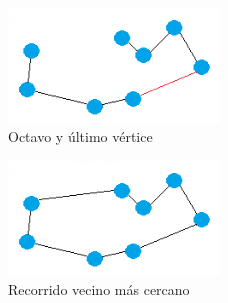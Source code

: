 \begin{frame}
	\begin{exampleblock}{ } 
	\begin{figure}[htbH] 
		\centering
		\includegraphics[width=0.5\textwidth]{./Imagenes/arista8.png}
		\caption{Octavo y último vértice} 
	\end{figure}
	\end{exampleblock}
\end{frame}

\begin{frame}
	\begin{exampleblock}{ }
	\begin{figure}[htbH] 
		\centering
		\includegraphics[width=0.5\textwidth]{./Imagenes/arista9.png}
		\caption{Recorrido vecino más cercano} 
	\end{figure}
	\end{exampleblock}
\end{frame}


